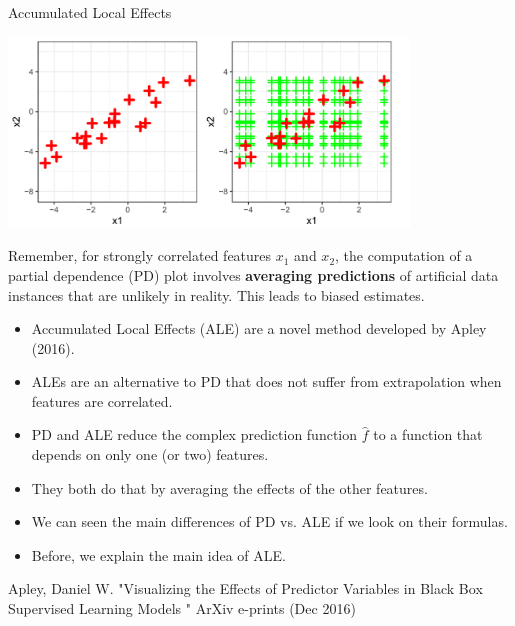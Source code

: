 







\begin{vbframe}{Accumulated Local Effects}


\begin{center}
\includegraphics[width=0.8\textwidth]{figure_man/accu01.png}
\end{center}

Remember, for strongly correlated features $x_1$ and $x_2$, the computation of a partial dependence (PD) plot involves \textbf{averaging predictions} of artificial data instances that are unlikely in reality.
This leads to biased estimates.

\framebreak

\begin{itemize}
  \item Accumulated Local Effects (ALE) are a novel method developed by Apley (2016).
  \item ALEs are an alternative to PD that does not suffer from extrapolation when features are correlated.
  \item PD and ALE reduce the complex prediction function $\hat{f}$ to a function that depends on only one (or two) features.
  \item They both do that by averaging the effects of the other features.
  \item We can seen the main differences of PD vs. ALE if we look on their formulas.
  \item Before,  we explain the main idea of ALE.
\end{itemize}
\vspace{1cm}
{\tiny{Apley, Daniel W. "Visualizing the Effects of Predictor Variables in Black Box Supervised Learning Models " ArXiv e-prints (Dec 2016)}\par}
\end{vbframe}

